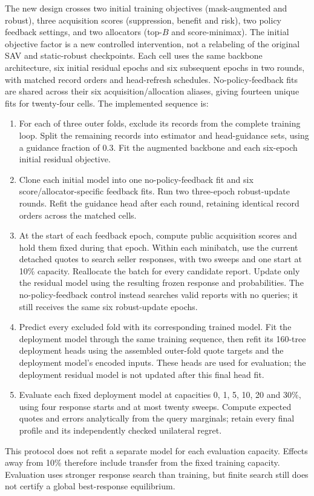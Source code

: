 \documentclass[11pt]{article}
\begin{document}
The new design crosses two initial training objectives (mask-augmented and
robust), three acquisition scores (suppression, benefit and risk), two policy
feedback settings, and two allocators (top-$B$ and score-minimax). The initial
objective factor is a new controlled intervention, not a relabeling of the
original SAV and static-robust checkpoints. Each cell uses the same backbone
architecture, six initial residual epochs and six subsequent epochs in two
rounds, with matched record orders and head-refresh schedules. No-policy-feedback
fits are shared across their six acquisition/allocation aliases, giving fourteen
unique fits for twenty-four cells. The implemented sequence is:
\begin{enumerate}
\item For each of three outer folds, exclude its records from the complete
training loop. Split the remaining records into estimator and head-guidance
sets, using a guidance fraction of 0.3. Fit the augmented backbone and each
six-epoch initial residual objective.
\item Clone each initial model into one no-policy-feedback fit and six
score/allocator-specific feedback fits. Run two three-epoch robust-update
rounds. Refit the guidance head after each round, retaining identical record
orders across the matched cells.
\item At the start of each feedback epoch, compute public acquisition scores
and hold them fixed during that epoch. Within each minibatch, use the current
detached quotes to search seller responses, with two sweeps and one start at
10\% capacity. Reallocate the batch for every candidate report. Update only
the residual model using the resulting frozen response and probabilities.
The no-policy-feedback control instead searches valid reports with no queries;
it still receives the same six robust-update epochs.
\item Predict every excluded fold with its corresponding trained model. Fit
the deployment model through the same training sequence, then refit its
160-tree deployment heads using the assembled outer-fold quote targets and
the deployment model's encoded inputs. These heads are used for evaluation;
the deployment residual model is not updated after this final head fit.
\item Evaluate each fixed deployment model at capacities 0, 1, 5, 10, 20 and
30\%, using four response starts and at most twenty sweeps. Compute expected
quotes and errors analytically from the query marginals; retain every final
profile and its independently checked unilateral regret.
\end{enumerate}
This protocol does not refit a separate model for each evaluation capacity.
Effects away from 10\% therefore include transfer from the fixed training
capacity. Evaluation uses stronger response search than training, but finite
search still does not certify a global best-response equilibrium.
\end{document}
